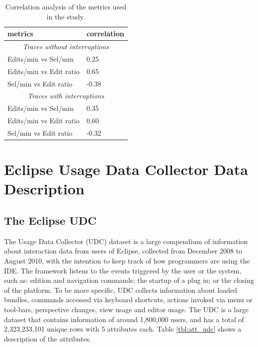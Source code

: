 \documentclass[times]{smrauth}
\begin{document}
\begin{table}
	\small
	\renewcommand{\arraystretch}{1.3}
	\caption{Correlation analysis of the metrics used in the study.}
	\label{tbl:corr_analysis}
	\centering
	\begin{tabular}{|p{4cm}|p{2cm}|}
		\hline 
		metrics & correlation \\  
		\hline 
		\multicolumn{2}{c}{\textit{Traces without interruptions}} \\
		\hline 
		Edits/min vs Sel/min &  0.25  \\
		Edits/min vs Edit ratio &  0.65\\
		Sel/min vs Edit ratio & -0.38  \\
		\hline 
		\multicolumn{2}{c}{\textit{Traces with interruptions}} \\
		\hline 
		Edits/min vs Sel/min &  0.35  \\
		Edits/min vs Edit ratio &  0.60\\
		Sel/min vs Edit ratio & -0.32  \\
		\hline
	\end{tabular}
\end{table}



\section{Eclipse Usage Data Collector Data Description}

\subsection{The Eclipse UDC}
The Usage Data Collector (UDC) dataset is a large compendium of information about interaction data from users of Eclipse, collected from December 2008 to August 2010, with the intention to keep track of how programmers are using the IDE. The framework listens to the events triggered by the user or the system, such as: edition and navigation commands; the startup of a plug in; or the closing of the platform. To be more specific, UDC collects information about loaded bundles, commands accessed via keyboard shortcuts, actions invoked via menu or tool-bars, perspective changes, view usage and editor usage. The UDC is a large dataset that contains information of around 1,800,000 users, and has a total of 2,323,233,101 unique rows with 5 attributes each. Table \ref{tbl:att_udc} shows a description of the attributes.
\end{document}
